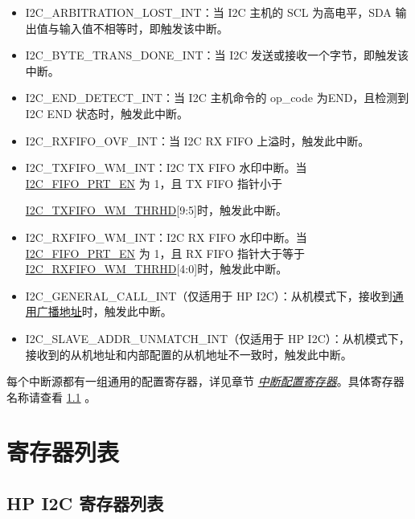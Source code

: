 \documentclass[main\_\_CN.tex]{subfiles}
\begin{document}
\begin{itemize}
\item \label{int:i2c-arbitration-lost}I2C\_ARBITRATION\_LOST\_INT：当 I2C 主机的 SCL 为高电平，SDA 输出值与输入值不相等时，即触发该中断。
\item \label{int:i2c-byte-trans-done}I2C\_BYTE\_TRANS\_DONE\_INT：当 I2C 发送或接收一个字节，即触发该中断。
\item \label{int:i2c-end}I2C\_END\_DETECT\_INT：当 I2C 主机命令的 op\_code 为END，且检测到 I2C END 状态时，触发此中断。
\item \label{int:i2c-rxfifo-ovf}I2C\_RXFIFO\_OVF\_INT：当 I2C RX FIFO 上溢时，触发此中断。
\item \label{int:i2c-txfifo-wm}I2C\_TXFIFO\_WM\_INT：I2C TX FIFO 水印中断。当 \hyperref[fielddesc:I2CFIFOPRTEN]{I2C\_FIFO\_PRT\_EN} 为 1，且 TX FIFO 指针小于

\hyperref[fielddesc:I2CTXFIFOWMTHRHD]{I2C\_TXFIFO\_WM\_THRHD}[9:5]时，触发此中断。
\item \label{int:i2c-rxfifo-wm}I2C\_RXFIFO\_WM\_INT：I2C RX FIFO 水印中断。当 \hyperref[fielddesc:I2CFIFOPRTEN]{I2C\_FIFO\_PRT\_EN} 为 1，且 RX FIFO 指针大于等于
\hyperref[fielddesc:I2CRXFIFOWMTHRHD]{I2C\_RXFIFO\_WM\_THRHD}[4:0]时，触发此中断。
\item \label{int:i2c-general-call}I2C\_GENERAL\_CALL\_INT（仅适用于 HP I2C）：从机模式下，接收到\href{https://www.csd.uoc.gr/~hy428/reading/i2c_spec.pdf#page=16}{通用广播地址}时，触发此中断。
\item \label{int:i2c-slave-addr}I2C\_SLAVE\_ADDR\_UNMATCH\_INT（仅适用于 HP I2C）：从机模式下，接收到的从机地址和内部配置的从机地址不一致时，触发此中断。
\end{itemize}

每个中断源都有一组通用的配置寄存器，详见章节 \hyperref[interrupt-config-registers]{\textit{中断配置寄存器}}。具体寄存器名称请查看 \ref{sec:i2c-ext-reg-summ} \textit{}。



\newpage
\section{寄存器列表}


\subsection{HP I2C 寄存器列表}
\label{sec:i2c-ext-reg-summ}
\hypertarget{i2c-ext-reg-summ}{}
\end{document}
